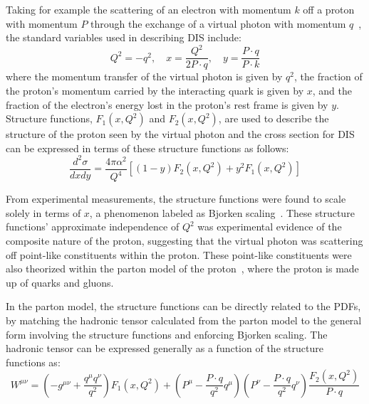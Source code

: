 Taking for example the scattering of an electron with momentum $k$ off a proton with momentum $P$ through the exchange of a virtual photon with momentum $q$~\cite{Halzen:1984quarks_leptons,Ellis:1996qcd_collider_physics}, 
the standard variables used in describing DIS include: 
\begin{equation}
    Q^2 = -q^2, \quad x = \frac{Q^2}{2P\cdot q}, \quad y = \frac{P\cdot q}{P\cdot k}
\end{equation}
where the momentum transfer of the virtual photon is given by $q^2$, the fraction of the proton’s momentum carried by the interacting quark is given by $x$, and the fraction of the electron’s energy lost in the proton's rest frame is given by $y$.
Structure functions, $F_1(x,Q^2)$ and $F_2(x,Q^2)$, are used to describe the structure of the proton seen by the virtual photon and the cross section for DIS can be expressed in terms of these structure functions as follows:
\begin{equation}
    \frac{d^2\sigma}{dx dy} = \frac{4\pi \alpha^2}{Q^4} \left[ (1-y) F_2(x,Q^2) + y^2 F_1(x,Q^2) \right]    
\end{equation}

From experimental measurements, the structure functions were found to scale solely in terms of $x$, a phenomenon labeled as Bjorken scaling~\cite{Bjorken_scaling}.
These structure functions' approximate independence of $Q^2$ was experimental evidence of the composite nature of the proton, suggesting that the virtual photon was scattering off point-like constituents within the proton.
These point-like constituents were also theorized within the parton model of the proton~\cite{feynman_parton_model}, where the proton is made up of quarks and gluons. 

In the parton model, the structure functions can be directly related to the PDFs, by matching the hadronic tensor calculated from the parton model to the general form involving the structure functions and enforcing Bjorken scaling.
The hadronic tensor can be expressed generally as a function of the structure functions as:
\begin{equation}
    W^{\mu\nu} = (-g^{\mu\nu} + \frac{q^\mu q^\nu}{q^2}) F_1(x,Q^2) + (P^\mu - \frac{P\cdot q}{q^2} q^\mu)(P^\nu - \frac{P\cdot q}{q^2} q^\nu) \frac{F_2(x,Q^2)}{P\cdot q}
\end{equation}

